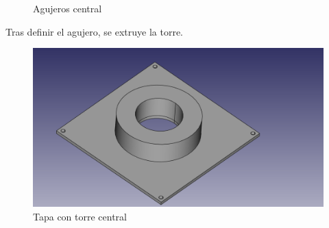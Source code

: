 \begin{figure}[H]
\centering
{}
\caption{Agujeros central}
\label{fig:agujeros_central_tapa_superior}
\end{figure}

Tras definir el agujero, se extruye la torre.

\begin{figure}[H]
    \centering
    \includegraphics[width=.9\linewidth]{pictures/TorreCentral.png}
    \caption{Tapa con torre central}
    \label{fig:torre_central_tapa_superior}
\end{figure}

